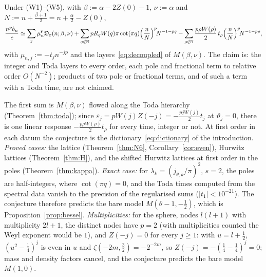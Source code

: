 \begin{conjecture}\label{conj:W}
Under \textup{(W1)--(W5)}, with $\beta:=\alpha-2Z(0)-1$, $\nu:=\alpha$ and $N:=n+\frac{\beta+1}2=n+\frac\alpha2-Z(0)$,
\[
  \frac{n^pb_n}c\simeq\sum_{\mathbf r}\mu_n^{\mathbf r}\mathfrak D_{\mathbf r}(n;\beta,\nu)
  +\sum_{q\notin\mathbb{N}}pR_qW(q)\pi\cot(\pi q)\Bigl(\frac nN\Bigr)^p\!N^{-1-pq}
  -\sum_{\rho\notin\mathbb{N}}\frac{p\rho W(\rho)}2\,t_\rho\Bigl(\frac nN\Bigr)^p\!N^{-1-p\rho},
\]
with $\mu_{n,j}:=-t_jn^{-jp}$ and the layers~\eqref{eq:decoupled} of $M(\beta,\nu)$. The claim is: the integer and Toda layers to every order, each
pole and fractional term to relative order $O(N^{-2})$; products of two pole or fractional terms, and of such a term with a Toda time, are not
claimed.
\end{conjecture}

The first sum is $M(\beta,\nu)$ flowed along the Toda hierarchy (Theorem~\ref{thm:toda}); since $\varepsilon_j=pW(j)Z(-j)=-\frac{pjW(j)}2t_j$ at
$\vartheta_j=0$, there is one linear response $-\frac{p\rho W(\rho)}2t_\rho$ for every time, integer or not. At first order in each datum the conjecture is
the dictionary~\eqref{eq:dictionary} of the introduction. \emph{Proved cases:} the lattice (Theorem~\ref{thm:N6}, Corollary~\ref{cor:even}),
Hurwitz lattices (Theorem~\ref{thm:H}), and the shifted Hurwitz lattices at first order in the poles (Theorem~\ref{thm:kappa}). \emph{Exact
case:} for $\lambda_k=(j_{\theta,k}/\pi)^2$, $s=2$, the poles are half-integers, where $\cot(\pi q)=0$, and the Toda times computed from the spectral
data vanish to the precision of the regularised sums ($|t_1|<10^{-21}$). The conjecture therefore predicts the bare model $M(\theta-1,-\frac12)$,
which is Proposition~\ref{prop:bessel}. \emph{Multiplicities:} for the sphere, nodes $l(l+1)$ with multiplicity $2l+1$, the distinct nodes have $p=2$ (with
multiplicities counted the Weyl exponent would be $1$), and $Z(-j)=0$ for every $j\ge1$: with $u=l+\frac12$, $(u^2-\frac14)^j$ is even in $u$ and
$\zeta(-2m,\frac32)=-2^{-2m}$, so $Z(-j)=-(\frac14-\frac14)^j=0$; mass and density factors cancel, and the conjecture predicts the bare model
$M(1,0)$.

